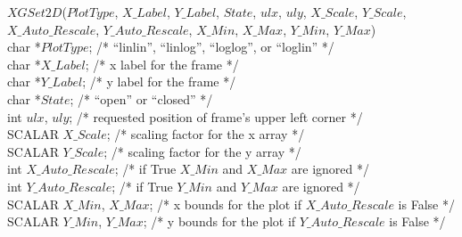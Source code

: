\begin{flushleft}
$XGSet2D$($PlotType$, $X\_Label$, $Y\_Label$, $State$, $ulx$, $uly$, $X\_Scale$, $Y\_Scale$, \\
\hspace{.8in} $X\_Auto\_Rescale$, $Y\_Auto\_Rescale$, $X\_Min$, $X\_Max$, $Y\_Min$, $Y\_Max$) \\
char  *$PlotType$;         /* ``linlin'', ``linlog'', ``loglog'', or ``loglin'' */ \\
char  *$X\_Label$;         /* x label for the frame                            */ \\
char  *$Y\_Label$;         /* y label for the frame                            */ \\
char  *$State$;            /* ``open'' or ``closed''                           */ \\
int    $ulx$, $uly$;       /* requested position of frame's upper left corner   */ \\
SCALAR  $X\_Scale$;         /* scaling factor for the x array                   */ \\
SCALAR  $Y\_Scale$;         /* scaling factor for the y array                   */ \\
int    $X\_Auto\_Rescale$; /* if True $X\_Min$ and $X\_Max$ are ignored       */ \\
int    $Y\_Auto\_Rescale$; /* if True $Y\_Min$ and $Y\_Max$ are ignored       */ \\
SCALAR  $X\_Min$, $X\_Max$; /* x bounds for the plot if $X\_Auto\_Rescale$ is False  */ \\
SCALAR  $Y\_Min$, $Y\_Max$; /* y bounds for the plot if $Y\_Auto\_Rescale$ is False  */ 
\end{flushleft}

